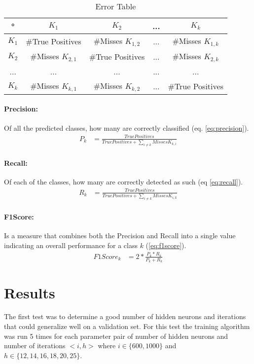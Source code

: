 \documentclass{article}
\begin{document}
\begin{table}
\begin{tabular}{|c | c | c| c| c|}
\hline
° &  $K_{1}$ &  $K_{2}$  & ... & $K_{k}$ \\
\hline
 $K_{1}$  & \#True Positives & \#Misses $K_{1,2}$ & ... & \#Misses $K_{1,k}$  \\
\hline
 $K_{2}$  & \#Misses $K_{2,1}$ & \#True Positives &  ... & \#Misses $K_{2,k}$  \\
\hline
... & ... & ... & ... & ... \\
\hline
 $K_{k}$  & \#Misses $K_{k,1}$ & \#Misses $K_{k,2}$ & ... & \#True Positives   \\
\hline
\end{tabular}
\caption{Error Table}
\label{tb:tbError}
\end{table}
 
\paragraph{Precision:}  
Of all the predicted classes, how many are correctly classified (eq. \ref{eq:precision}).
\begin{align}
P_k &= \frac{True Positives}{True Positives + \sum_{i \ne k}{Misses K_{k,i}}} \label{eq:precision} 
\end{align}
\paragraph{Recall:} 
Of each of the classes, how many are correctly detected as such (eq \ref{eq:recall}).
\begin{align}
R_k &= \frac{True Positives}{True Positives + \sum_{i \ne k}{Misses K_{i,k}}} \label{eq:recall}
\end{align}
\paragraph{F1Score:} 
Is a measure that combines both the Precision and Recall into a single value indicating an overall performance for a class $k$ (\ref{eq:f1score}).
\begin{align}
F1Score_k &= 2 * \frac{P_k*R_k}{P_k+R_k} \label{eq:f1score}
\end{align}


\section{Results}

The first test was to determine a good number of hidden neurons and iterations that could generalize well
on a validation set. For this test the training algorithm was run 5 times for each parameter pair of number
of hidden neurons and number of iterations $<i,h>$ where $i \in \{600,1000\}$ and $h \in \{12,14,16,18,20,25\}$.
\end{document}
